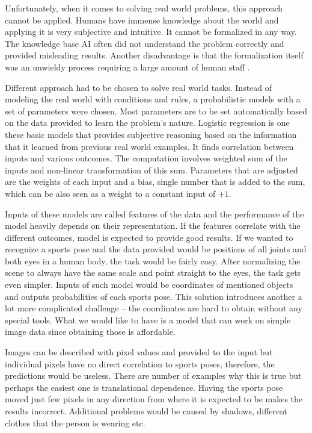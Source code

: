Unfortunately, when it comes to solving real world problems, this approach cannot be applied. Humans have immense knowledge about the world and applying it is very subjective and intuitive. It cannot be formalized in any way. The knowledge base AI often did not understand the problem correctly and provided misleading results. Another disadvantage is that the formalization itself was an unwieldy process requiring a large amount of human staff \cite{Goodfellow-et-al-2016}.

Different approach had to be chosen to solve real world tasks. Instead of modeling the real world with conditions and rules, a probabilistic models with a set of parameters were chosen. Most parameters are to be set automatically based on the data provided to learn the problem's nature. Logistic regression is one these basic models that provides subjective reasoning based on the information that it learned from previous real world examples. It finds correlation between inputs and various outcomes. The computation involves weighted sum of the inputs and non-linear transformation of this sum. Parameters that are adjusted are the weights of each input and a bias, single number that is added to the sum, which can be also seen as a weight to a constant input of $+1$. 

Inputs of these models are called features of the data and the performance of the model heavily depends on their representation. If the features correlate with the different outcomes, model is expected to provide good results. If we wanted to recognize a sports pose and the data provided would be positions of all joints and both eyes in a human body, the task would be fairly easy. After normalizing the scene to always have the same scale and point straight to the eyes, the task gets even simpler. Inputs of such model would be coordinates of mentioned objects and outputs probabilities of each sports pose. This solution introduces another a lot more complicated challenge -- the coordinates are hard to obtain without any special tools. What we would like to have is a model that can work on simple image data since obtaining those is affordable.

Images can be described with pixel values and provided to the input but individual pixels have no direct correlation to sports poses, therefore, the predictions would be useless. There are number of examples why this is true but perhaps the easiest one is translational dependence. Having the sports pose moved just few pixels in any direction from where it is expected to be makes the results incorrect. Additional problems would be caused by shadows, different clothes that the person is wearing etc.

